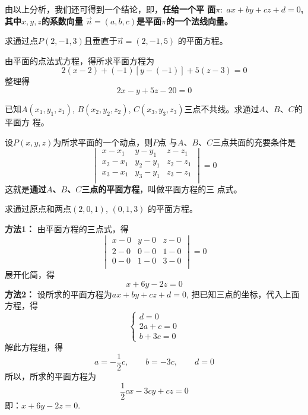由以上分析，我们还可得到一个结论，即，\textbf{任给一个平
面$\pi:\; ax+by+cz+d=0$, 其中$x,y,z$的系数向量  
$\vec{n}=(a,b,c)$是平面$\pi$的一个法线向量。
}

\begin{example}
    求通过点$P(2,-1,3)$且垂直于$\vec{n}=(2,-1,5)$
的平面方程。
\end{example}

\begin{solution}
    由平面的点法式方程，得所求平面方程为
\[2(x-2)+(-1)[y-(-1)]+5(z-3)=0\]
整理得
\[2x-y+5z-20=0\]
\end{solution}




\begin{example}
    已知$A(x_1,y_1,z_1)$, $B(x_2,y_2,z_2)$, 
$C(x_3,y_3,z_3)$三点不共线。求通过$A$、$B$、$C$的平面方
程。
\end{example}

\begin{solution}
    设$P(x,y,z)$为所求平面的一个动点，则$P$点
与$A$、$B$、$C$三点共面的充要条件是
\[\begin{vmatrix}
    x-x_1&y-y_1&z-z_1\\
    x_2-x_1&y_2-y_1&z_2-z_1\\
    x_3-x_1&y_3-y_1&z_3-z_1\\
\end{vmatrix}=0\]
这就是\textbf{通过$A$、$B$、$C$三点的平面方程}，叫做平面方程的三
点式。
\end{solution}




\begin{example}
    求通过原点和两点$(2,0,1)$, $(0,1,3)$
的平面方程。
\end{example}

\begin{solution}
\textbf{方法1：} 由平面方程的三点式，得
\[\begin{vmatrix}
x-0&y-0&z-0\\    
2-0&0-0&1-0\\ 
0-0&1-0&3-0\\ 
\end{vmatrix}=0\]
展开化简，得
\[x+6y-2z=0\]
\textbf{方法2：}
设所求的平面方程为$ax+by+cz+d=0$, 
把已知三点的坐标，代入上面方程，得
\[\begin{cases}
    d=0\\
    2a+c=0\\
    b+3c=0
\end{cases}\]
解此方程组，得
\[a=-\frac{1}{2}c,\qquad b=-3c,\qquad d=0\]
所以，所求的平面方程为
\[\frac{1}{2}cx-3cy+cz=0\]
即：$x+6y-2z=0$.
\end{solution}


